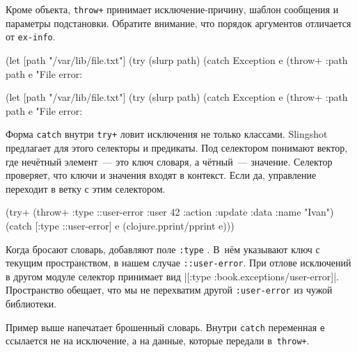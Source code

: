 \fi

Кроме объекта, \verb|throw+| принимает исключе\-ние-причину, шаблон сообщения и
параметры подстановки. Обратите внимание, что порядок аргументов отличается от
\verb|ex-info|.

\ifx\devicetype\mobile

\begin{english}
  \begin{clojure}
(let [path "/var/lib/file.txt"]
  (try
    (slurp path)
    (catch Exception e
      (throw+ {:path path} e
      "File error: %
  \end{clojure}
\end{english}

\else

\begin{english}
  \begin{clojure}
(let [path "/var/lib/file.txt"]
  (try
    (slurp path)
    (catch Exception e
      (throw+ {:path path} e "File error: %
  \end{clojure}
\end{english}

\fi


Форма \verb|catch| внутри \verb|try+| ловит исключения не только
классами. Slingshot предлагает для этого селекторы и предикаты. Под селектором
понимают вектор, где нечётный элемент~--- это ключ словаря, а чётный~---
значение. Селектор проверяет, что ключи и значения входят в контекст. Если да,
управление переходит в ветку с этим селектором.

\begin{english}
  \begin{clojure/lines}
(try+
 (throw+ {:type ::user-error
          :user 42
          :action :update
          :data {:name "Ivan"}})
 (catch [:type ::user-error] e
   (clojure.pprint/pprint e)))
  \end{clojure/lines}
\end{english}

Когда бросают словарь, добавляют поле \verb|:type| . В~нём указывают
ключ с текущим пространством, в нашем случае \verb|::user-error|. При отлове
исключений в другом модуле селектор принимает вид
\spverb|[:type :book.exceptions/user-error]|. Пространство обещает, что мы не
перехватим другой \texttt{:user\--error} из чужой библиотеки.

Пример выше напечатает брошенный словарь. Внутри \verb|catch| переменная
\verb|e| ссылается не на исключение, а на данные, которые передали
в~\verb|throw+|.

